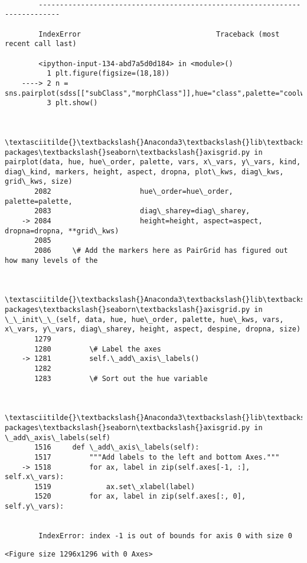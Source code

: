 \documentclass[11pt]{article}
\begin{document}
    \begin{Verbatim}[commandchars=\\\{\}]

        ---------------------------------------------------------------------------

        IndexError                                Traceback (most recent call last)

        <ipython-input-134-abd7a5d0d184> in <module>()
          1 plt.figure(figsize=(18,18))
    ----> 2 n = sns.pairplot(sdss[["subClass","morphClass"]],hue="class",palette="coolwarm\_r")
          3 plt.show()
    

        \textasciitilde{}\textbackslash{}Anaconda3\textbackslash{}lib\textbackslash{}site-packages\textbackslash{}seaborn\textbackslash{}axisgrid.py in pairplot(data, hue, hue\_order, palette, vars, x\_vars, y\_vars, kind, diag\_kind, markers, height, aspect, dropna, plot\_kws, diag\_kws, grid\_kws, size)
       2082                     hue\_order=hue\_order, palette=palette,
       2083                     diag\_sharey=diag\_sharey,
    -> 2084                     height=height, aspect=aspect, dropna=dropna, **grid\_kws)
       2085 
       2086     \# Add the markers here as PairGrid has figured out how many levels of the
    

        \textasciitilde{}\textbackslash{}Anaconda3\textbackslash{}lib\textbackslash{}site-packages\textbackslash{}seaborn\textbackslash{}axisgrid.py in \_\_init\_\_(self, data, hue, hue\_order, palette, hue\_kws, vars, x\_vars, y\_vars, diag\_sharey, height, aspect, despine, dropna, size)
       1279 
       1280         \# Label the axes
    -> 1281         self.\_add\_axis\_labels()
       1282 
       1283         \# Sort out the hue variable
    

        \textasciitilde{}\textbackslash{}Anaconda3\textbackslash{}lib\textbackslash{}site-packages\textbackslash{}seaborn\textbackslash{}axisgrid.py in \_add\_axis\_labels(self)
       1516     def \_add\_axis\_labels(self):
       1517         """Add labels to the left and bottom Axes."""
    -> 1518         for ax, label in zip(self.axes[-1, :], self.x\_vars):
       1519             ax.set\_xlabel(label)
       1520         for ax, label in zip(self.axes[:, 0], self.y\_vars):
    

        IndexError: index -1 is out of bounds for axis 0 with size 0

    \end{Verbatim}

    
    \begin{verbatim}
<Figure size 1296x1296 with 0 Axes>
    \end{verbatim}
\end{document}
